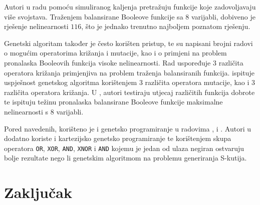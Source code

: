 \documentclass[times, utf8, diplomski, numeric]{fer}
\begin{document}
Autori u radu \cite{EvolvingBoolean} pomoću simuliranog kaljenja  \cite{SimulatedAnnealing} pretražuju funkcije koje zadovoljavaju više svojstava.
Traženjem balansirane Booleove funkcije sa 8 varijabli, dobiveno je rješenje nelinearnosti $116$, što je jednako trenutno najboljem poznatom rješenju.

Genetski algoritam \cite{holland1992adaptation} također je često korišten pristup, te su napisani brojni radovi o mogućim operatorima križanja i mutacije, kao i o primjeni na problem pronalaska Booleovih funkcija visoke nelinearnosti.
Rad \cite{manzoni2019balanced} uspoređuje $3$ različita operatora križanja primjenjiva na problem traženja balansiranih funkcija.
\cite{picek2014using} ispituje uspješnost genetskog algoritma korištenjem $3$ različita operatora mutacije, kao i $3$ različita operatora križanja.
U \cite{MaximalNonlinearity}, autori testiraju utjecaj različitih funkcija dobrote te ispituju težinu pronalaska balansirane Booleove funkcije maksimalne nelinearnosti s 8 varijabli.

Pored navedenih, korišteno je i genetsko programiranje \cite{koza1992genetic} u radovima \cite{picek2015cartesian}, \cite{picek2013evolving} i \cite{tesavr2010new}.
Autori u \cite{picek2015cartesian} dodatno koriste i kartezijsko genetsko programiranje te korištenjem skupa operatora \texttt{OR}, \texttt{XOR}, \texttt{AND}, \texttt{XNOR} i \texttt{AND} kojemu je jedan od ulaza negiran ostvaruju bolje rezultate nego li genetskim algoritmom na problemu generiranja S-kutija. 










\chapter{Zaključak}



\end{document}
